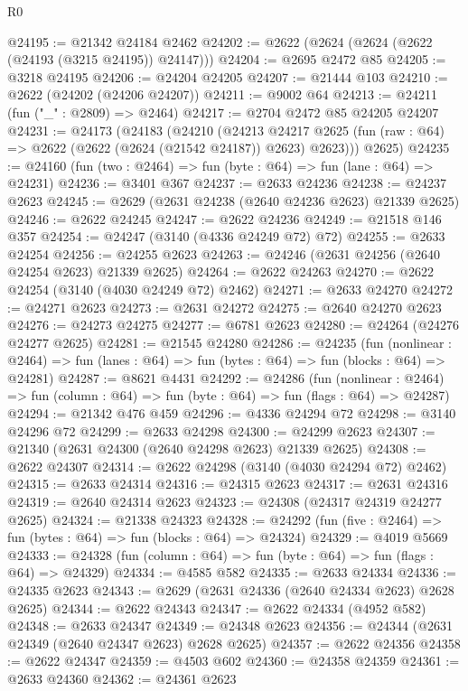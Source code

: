 \begin{lexlean}{R0}
\begin{coremodule}
@24195 := @21342 @24184 @2462
@24202 := @2622 (@2624 (@2624 (@2622 (@24193 (@3215 @24195)) @24147)))
@24204 := @2695 @2472 @85
@24205 := @3218 @24195
@24206 := @24204 @24205
@24207 := @21444 @103
@24210 := @2622 (@24202 (@24206 @24207))
@24211 := @9002 @64
@24213 := @24211 (fun ("_" : @2809) => @2464)
@24217 := @2704 @2472 @85 @24205 @24207
@24231 := @24173
    (@24183
      (@24210
        (@24213
          @24217
          @2625
          (fun (raw : @64) => @2622 (@2622 (@2624 (@21542 @24187)) @2623) @2623)))
      @2625)
@24235 := @24160 (fun (two : @2464) => fun (byte : @64) => fun (lane : @64) => @24231)
@24236 := @3401 @367
@24237 := @2633 @24236
@24238 := @24237 @2623
@24245 := @2629 (@2631 @24238 (@2640 @24236 @2623) @21339 @2625)
@24246 := @2622 @24245
@24247 := @2622 @24236
@24249 := @21518 @146 @357
@24254 := @24247 (@3140 (@4336 @24249 @72) @72)
@24255 := @2633 @24254
@24256 := @24255 @2623
@24263 := @24246 (@2631 @24256 (@2640 @24254 @2623) @21339 @2625)
@24264 := @2622 @24263
@24270 := @2622 @24254 (@3140 (@4030 @24249 @72) @2462)
@24271 := @2633 @24270
@24272 := @24271 @2623
@24273 := @2631 @24272
@24275 := @2640 @24270 @2623
@24276 := @24273 @24275
@24277 := @6781 @2623
@24280 := @24264 (@24276 @24277 @2625)
@24281 := @21545 @24280
@24286 := @24235
    (fun (nonlinear : @2464) =>
    fun (lanes : @64) => fun (bytes : @64) => fun (blocks : @64) => @24281)
@24287 := @8621 @4431
@24292 := @24286
    (fun (nonlinear : @2464) =>
    fun (column : @64) => fun (byte : @64) => fun (flags : @64) => @24287)
@24294 := @21342 @476 @459
@24296 := @4336 @24294 @72
@24298 := @3140 @24296 @72
@24299 := @2633 @24298
@24300 := @24299 @2623
@24307 := @21340 (@2631 @24300 (@2640 @24298 @2623) @21339 @2625)
@24308 := @2622 @24307
@24314 := @2622 @24298 (@3140 (@4030 @24294 @72) @2462)
@24315 := @2633 @24314
@24316 := @24315 @2623
@24317 := @2631 @24316
@24319 := @2640 @24314 @2623
@24323 := @24308 (@24317 @24319 @24277 @2625)
@24324 := @21338 @24323
@24328 := @24292 (fun (five : @2464) => fun (bytes : @64) => fun (blocks : @64) => @24324)
@24329 := @4019 @5669
@24333 := @24328 (fun (column : @64) => fun (byte : @64) => fun (flags : @64) => @24329)
@24334 := @4585 @582
@24335 := @2633 @24334
@24336 := @24335 @2623
@24343 := @2629 (@2631 @24336 (@2640 @24334 @2623) @2628 @2625)
@24344 := @2622 @24343
@24347 := @2622 @24334 (@4952 @582)
@24348 := @2633 @24347
@24349 := @24348 @2623
@24356 := @24344 (@2631 @24349 (@2640 @24347 @2623) @2628 @2625)
@24357 := @2622 @24356
@24358 := @2622 @24347
@24359 := @4503 @602
@24360 := @24358 @24359
@24361 := @2633 @24360
@24362 := @24361 @2623

\end{coremodule}
\end{lexlean}
